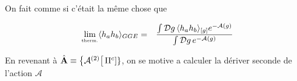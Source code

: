 On fait comme si c'était la même chose que 

\begin{eqnarray}
	\underset{\mbox{\tiny therm.}}{\lim} \langle h_a h_b  \rangle_{GGE} & =  & \frac{ \int  \mathcal{D}g\,  \langle h_a h_b\rangle_{[g]} e^{- \mathcal{A}(g)}    }{\int  \mathcal{D}g\,  e^{- \mathcal{A}(g)}}
\end{eqnarray}


En revenant à $\hat{\mathbf{A}} \equiv\left \{ \mathcal{A}^{(2)}\right [\Pi^c] \}$, on se motive a calculer la dériver seconde de l'action $\mathcal{A}$










